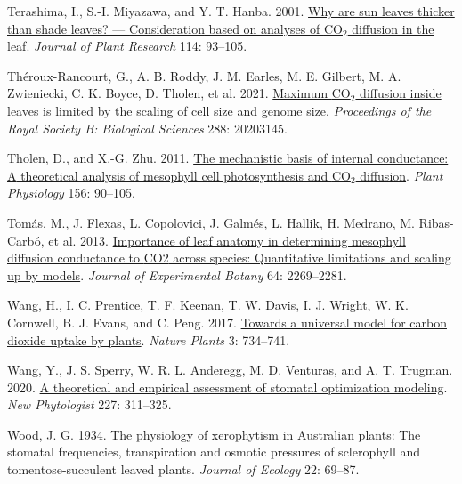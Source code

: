 \documentclass[
  letterpaper,
  DIV=11,
  numbers=noendperiod]{scrartcl}
\newlength{\cslhangindent}
\newlength{\cslentryspacingunit} %
\newenvironment{CSLReferences}[2] %
 {%
  \setlength{\parindent}{0pt}
  \ifodd #1
  \let\oldpar\par
  \def\par{\hangindent=\cslhangindent\oldpar}
  \fi
  \setlength{\parskip}{#2\cslentryspacingunit}
 }%
 {}
\begin{document}
\begin{CSLReferences}{1}{0}
\leavevmode{}%
Terashima, I., S.-I. Miyazawa, and Y. T. Hanba. 2001.
\href{https://doi.org/10.1007/PL00013972}{Why are sun leaves thicker
than shade leaves? --- {Consideration} based on analyses of
{CO}\(_{\textrm{2}}\) diffusion in the leaf}. \emph{Journal of Plant
Research} 114: 93--105.

\leavevmode{}%
Théroux-Rancourt, G., A. B. Roddy, J. M. Earles, M. E. Gilbert, M. A.
Zwieniecki, C. K. Boyce, D. Tholen, et al. 2021.
\href{https://doi.org/10.1098/rspb.2020.3145}{Maximum
{CO}\(_{\textrm{2}}\) diffusion inside leaves is limited by the scaling
of cell size and genome size}. \emph{Proceedings of the Royal Society B:
Biological Sciences} 288: 20203145.

\leavevmode{}%
Tholen, D., and X.-G. Zhu. 2011.
\href{https://doi.org/10.1104/pp.111.172346}{The mechanistic basis of
internal conductance: {A} theoretical analysis of mesophyll cell
photosynthesis and {CO}\(_{\textrm{2}}\) diffusion}. \emph{Plant
Physiology} 156: 90--105.

\leavevmode{}%
Tomás, M., J. Flexas, L. Copolovici, J. Galmés, L. Hallik, H. Medrano,
M. Ribas-Carbó, et al. 2013.
\href{https://doi.org/10.1093/jxb/ert086}{Importance of leaf anatomy in
determining mesophyll diffusion conductance to {CO2} across species:
Quantitative limitations and scaling up by models}. \emph{Journal of
Experimental Botany} 64: 2269--2281.

\leavevmode{}%
Wang, H., I. C. Prentice, T. F. Keenan, T. W. Davis, I. J. Wright, W. K.
Cornwell, B. J. Evans, and C. Peng. 2017.
\href{https://doi.org/10.1038/s41477-017-0006-8}{Towards a universal
model for carbon dioxide uptake by plants}. \emph{Nature Plants} 3:
734--741.

\leavevmode{}%
Wang, Y., J. S. Sperry, W. R. L. Anderegg, M. D. Venturas, and A. T.
Trugman. 2020. \href{https://doi.org/10.1111/nph.16572}{A theoretical
and empirical assessment of stomatal optimization modeling}. \emph{New
Phytologist} 227: 311--325.

\leavevmode{}%
Wood, J. G. 1934. The physiology of xerophytism in {Australian} plants:
The stomatal frequencies, transpiration and osmotic pressures of
sclerophyll and tomentose-succulent leaved plants. \emph{Journal of
Ecology} 22: 69--87.


\end{CSLReferences}
\end{document}
